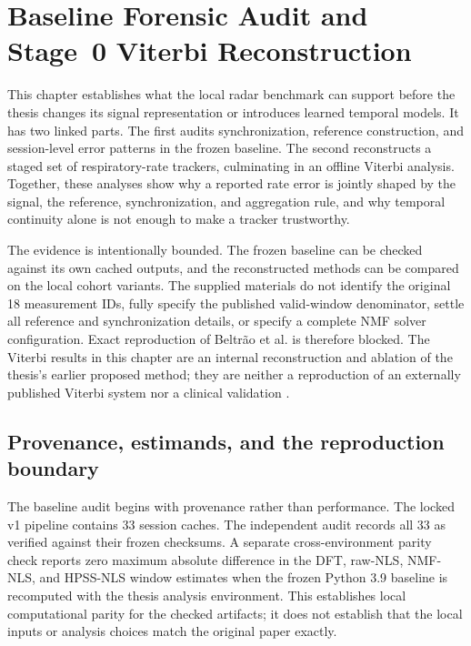 \chapter{Baseline Forensic Audit and Stage~0 Viterbi Reconstruction}
\label{ch:forensics_viterbi}

This chapter establishes what the local radar benchmark can support before the thesis changes
its signal representation or introduces learned temporal models. It has two linked parts. The first
audits synchronization, reference construction, and session-level error patterns in the frozen
baseline. The second reconstructs a staged set of respiratory-rate trackers, culminating in an
offline Viterbi analysis. Together, these analyses show why a reported rate error is jointly
shaped by the signal, the reference, synchronization, and aggregation rule, and why temporal
continuity alone is not enough to make a tracker trustworthy.

The evidence is intentionally bounded. The frozen baseline can be checked against its own cached
outputs, and the reconstructed methods can be compared on the local cohort variants. The supplied
materials do not identify the original 18 measurement IDs, fully specify the published valid-window
denominator, settle all reference and synchronization details, or specify a complete NMF solver
configuration. Exact reproduction of Beltr\~ao et al. is therefore blocked. The Viterbi results in
this chapter are an internal reconstruction and ablation of the thesis's earlier proposed method;
they are neither a reproduction of an externally published Viterbi system nor a clinical
validation \citep{beltrao2022contactless}.

\section{Provenance, estimands, and the reproduction boundary}
\label{sec:ch3_provenance}

The baseline audit begins with provenance rather than performance. The locked v1 pipeline contains
33 session caches. The independent audit records all 33 as verified against their frozen
checksums. A separate cross-environment parity check reports zero maximum absolute difference in
the DFT, raw-NLS, NMF-NLS, and HPSS-NLS window estimates when the frozen Python 3.9 baseline is
recomputed with the thesis analysis environment. This establishes local computational parity for
the checked artifacts; it does not establish that the local inputs or analysis choices match the
original paper exactly.

